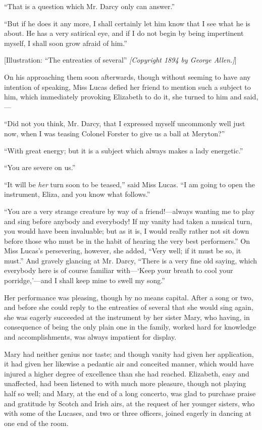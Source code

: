 \documentclass[12pt]{book}
\begin{document}
``That is a question which Mr. Darcy only can answer.''

``But if he does it any more, I shall certainly let him know that I see what he is about. He has a very satirical eye, and if I do not begin by being impertinent myself, I shall soon grow afraid of him.''

[Illustration: ``The entreaties of several'' \emph{[\textit{Copyright 1894 by George Allen.}]}]

On his approaching them soon afterwards, though without seeming to have any intention of speaking, Miss Lucas defied her friend to mention such a subject to him, which immediately provoking Elizabeth to do it, she turned to him and said,---

``Did not you think, Mr. Darcy, that I expressed myself uncommonly well just now, when I was teasing Colonel Forster to give us a ball at Meryton?''

``With great energy; but it is a subject which always makes a lady energetic.''

``You are severe on us.''

``It will be \textit{her} turn soon to be teased,'' said Miss Lucas. ``I am going to open the instrument, Eliza, and you know what follows.''

``You are a very strange creature by way of a friend!---always wanting me to play and sing before anybody and everybody! If my vanity had taken a musical turn, you would have been invaluable; but as it is, I would really rather not sit down before those who must be in the habit of hearing the very best performers.'' On Miss Lucas's persevering, however, she added, ``Very well; if it must be so, it must.'' And gravely glancing at Mr. Darcy, ``There is a very fine old saying, which everybody here is of course familiar with---`Keep your breath to cool your porridge,'---and I shall keep mine to swell my song.''

Her performance was pleasing, though by no means capital. After a song or two, and before she could reply to the entreaties of several that she would sing again, she was eagerly succeeded at the instrument by her sister Mary, who having, in consequence of being the only plain one in the family, worked hard for knowledge and accomplishments, was always impatient for display.

Mary had neither genius nor taste; and though vanity had given her application, it had given her likewise a pedantic air and conceited manner, which would have injured a higher degree of excellence than she had reached. Elizabeth, easy and unaffected, had been listened to with much more pleasure, though not playing half so well; and Mary, at the end of a long concerto, was glad to purchase praise and gratitude by Scotch and Irish airs, at the request of her younger sisters, who with some of the Lucases, and two or three officers, joined eagerly in dancing at one end of the room.
\end{document}
